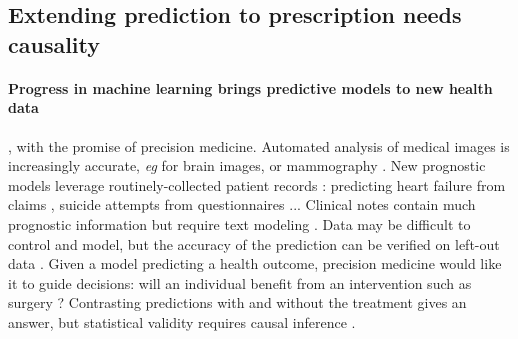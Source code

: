 \documentclass{report}
\begin{document}
\subsection{Extending prediction to prescription needs causality}\label{subsec:causal_model_selection:extending_prediction}

\paragraph{Progress in machine learning brings predictive models to new health
  data} \citep{beam2018big,rajkomar2019machine}, with the promise of precision
medicine. Automated analysis of medical images is increasingly accurate,
\emph{eg} for brain images, \citep{khojaste2022deep,zhang2019radiological} or
mammography \citep{yala2019deep,shen2019deep,nassif2022breast}. New prognostic
models leverage routinely-collected patient records \citep{mooney2018bigdata}:
predicting heart failure from claims \citep{desai2020comparison}, suicide
attempts from questionnaires \citep{simon2018predicting}... Clinical notes
contain much prognostic information but require text modeling
\citep{horng2017creating,wang2020prediction,spasic2020clinical,
  jiang2023health}. Data may be difficult to control and model, but the accuracy
of the prediction can be verified on left-out data
\citep{altman2009prognosis,poldrack2020establishment,varoquaux2022evaluating}.
Given a model predicting a health outcome, precision medicine would like it to
guide decisions: will an individual benefit from an intervention such as
surgery \citep{fontana2019can}? Contrasting predictions with and without the
treatment gives an answer, but statistical validity requires causal inference
\citep{snowden_implementation_2011,blakely2020reflection}.

\end{document}

